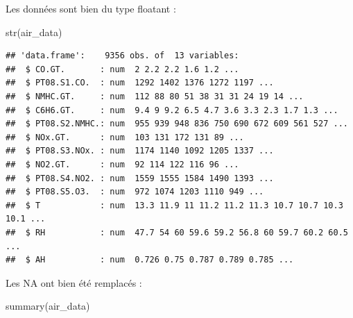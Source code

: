 \documentclass[
]{article}
\newenvironment{Shaded}{\begin{snugshade}}{\end{snugshade}}
\newcommand{\FunctionTok}[1]{\textcolor[rgb]{0.00,0.00,0.00}{#1}}
\newcommand{\NormalTok}[1]{#1}
\begin{document}
Les données sont bien du type floatant :

\begin{Shaded}
\begin{Highlighting}[]
\FunctionTok{str}\NormalTok{(air\_data)}
\end{Highlighting}
\end{Shaded}

\begin{verbatim}
## 'data.frame':    9356 obs. of  13 variables:
##  $ CO.GT.       : num  2 2.2 2.2 1.6 1.2 ...
##  $ PT08.S1.CO.  : num  1292 1402 1376 1272 1197 ...
##  $ NMHC.GT.     : num  112 88 80 51 38 31 31 24 19 14 ...
##  $ C6H6.GT.     : num  9.4 9 9.2 6.5 4.7 3.6 3.3 2.3 1.7 1.3 ...
##  $ PT08.S2.NMHC.: num  955 939 948 836 750 690 672 609 561 527 ...
##  $ NOx.GT.      : num  103 131 172 131 89 ...
##  $ PT08.S3.NOx. : num  1174 1140 1092 1205 1337 ...
##  $ NO2.GT.      : num  92 114 122 116 96 ...
##  $ PT08.S4.NO2. : num  1559 1555 1584 1490 1393 ...
##  $ PT08.S5.O3.  : num  972 1074 1203 1110 949 ...
##  $ T            : num  13.3 11.9 11 11.2 11.2 11.3 10.7 10.7 10.3 10.1 ...
##  $ RH           : num  47.7 54 60 59.6 59.2 56.8 60 59.7 60.2 60.5 ...
##  $ AH           : num  0.726 0.75 0.787 0.789 0.785 ...
\end{verbatim}

Les NA ont bien été remplacés :

\begin{Shaded}
\begin{Highlighting}[]
\FunctionTok{summary}\NormalTok{(air\_data)}
\end{Highlighting}
\end{Shaded}
\end{document}
